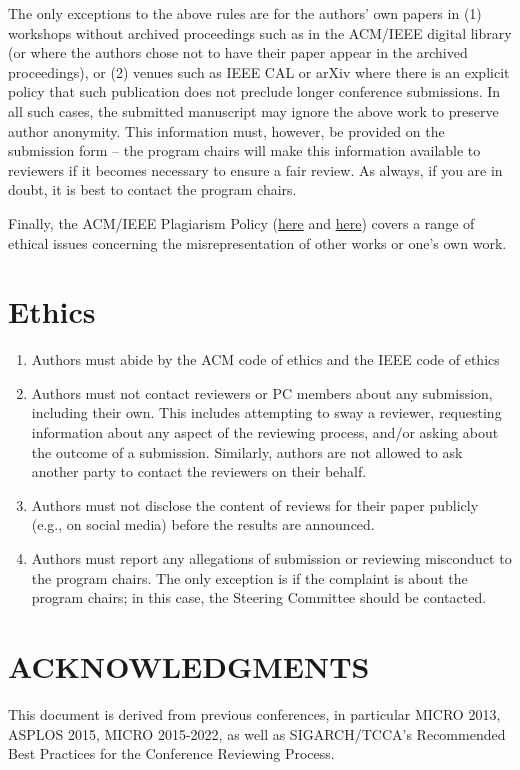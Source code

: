 \documentclass{sig-alternate}
\begin{document}
The only exceptions to the above rules are for the authors' own papers in (1) workshops without archived proceedings such as in the ACM/IEEE digital library (or where the authors chose not to have their paper appear in the archived proceedings), or (2) venues such as IEEE CAL or arXiv where there is an explicit policy that such publication does not preclude longer conference submissions.  In all such cases, the submitted manuscript may ignore the above work to preserve author anonymity. This information must, however, be provided on the submission form -- the program chairs will make this information available to reviewers if it becomes necessary to ensure a fair review.  As always, if you are in doubt, it is best to contact the program chairs.


Finally, the ACM/IEEE Plagiarism Policy (\href{http://www.acm.org/publications/policies/plagiarism_policy}{here} and \href{https://www.ieee.org/publications_standards/publications/rights/plagiarism.html}{here}) covers a range of ethical issues concerning the misrepresentation of other works or one's own work.


\section{Ethics}

\begin{enumerate}
\item Authors must abide by the ACM code of ethics and the IEEE code of ethics
\item Authors must not contact reviewers or PC members about any submission, including their own. This includes attempting to sway a reviewer, requesting information about any aspect of the reviewing process, and/or asking about the outcome of a submission. Similarly, authors are not allowed to ask another party to contact the reviewers on their behalf.
\item Authors must not disclose the content of reviews for their paper publicly (e.g., on social media)  before the results are announced. 
\item Authors must report any allegations of submission or reviewing misconduct to the program chairs. The only exception is if the complaint is about the program chairs; in this case, the Steering Committee should be contacted. 
\end{enumerate}


\section*{ACKNOWLEDGMENTS}
This document is derived from previous conferences, in particular MICRO 2013, ASPLOS 2015, MICRO 2015-2022, as well as SIGARCH/TCCA's Recommended Best Practices for the Conference Reviewing Process.






\end{document}
